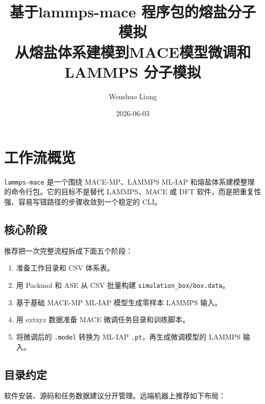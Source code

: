 \documentclass[11pt,a4paper]{article}
\title{\Huge\textsf{基于lammps-mace 程序包的熔盐分子模拟}\\[0.6em]
\large 从熔盐体系建模到MACE模型微调和LAMMPS 分子模拟}
\author{Wenshuo Liang}
\date{2026-06-03}
\begin{document}
\maketitle
\thispagestyle{empty}

\begin{center}
\end{center}

\vspace{1em}
\tableofcontents
\newpage

\section{工作流概览}

\texttt{lammps-mace} 是一个围绕 MACE-MP、LAMMPS ML-IAP 和熔盐体系建模整理的命令行包。它的目标不是替代 LAMMPS、MACE 或 DFT 软件，而是把重复性强、容易写错路径的步骤收敛到一个稳定的 CLI。

\subsection{核心阶段}

推荐把一次完整流程拆成下面五个阶段：

\begin{enumerate}
  \item 准备工作目录和 CSV 体系表。
  \item 用 Packmol 和 ASE 从 CSV 批量构建 \texttt{simulation\_box/box.data}。
  \item 基于基础 MACE-MP ML-IAP 模型生成零样本 LAMMPS 输入。
  \item 用 extxyz 数据准备 MACE 微调任务目录和训练脚本。
  \item 将微调后的 \texttt{.model} 转换为 ML-IAP \texttt{.pt}，再生成微调模型的 LAMMPS 输入。
\end{enumerate}

\subsection{目录约定}

软件安装、源码和任务数据建议分开管理。远端机器上推荐如下布局：
\end{document}
